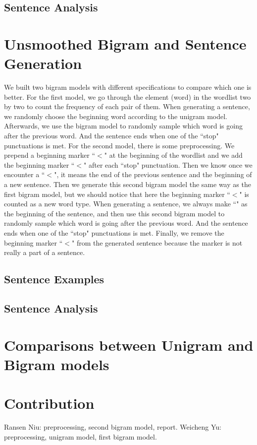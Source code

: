 \documentclass[a4paper, 11pt]{article}
\begin{document}
\subsection*{Sentence Analysis}

\section*{Unsmoothed Bigram and Sentence Generation}
We built two bigram models with different specifications to compare which one is better. \newline
\newline
For the first model, we go through the element (word) in the wordlist two by two to count the frequency of each pair of them. When generating a sentence, we randomly choose the beginning word according to the unigram model. Afterwards, we use the bigram model to randomly sample which word is going after the previous word. And the sentence ends when one of the ``stop" punctuations is met.\newline
\newline
For the second model, there is some preprocessing. We prepend a beginning marker ``$<$" at the beginning of the wordlist and we add the beginning marker ``$<$" after each ``stop" punctuation. Then we know once we encounter a ``$<$", it means the end of the previous sentence and the beginning of a new sentence. Then we generate this second bigram model the same way as the first bigram model, but we should notice that here the beginning marker ``$<$" is counted as a new word type. When generating a sentence, we always make ``" as the beginning of the sentence, and then use this second bigram model to randomly sample which word is going after the previous word. And the sentence ends when one of the ``stop" punctuations is met. Finally, we remove the beginning marker ``$<$" from the generated sentence because the marker is not really a part of a sentence.\newline

\subsection*{Sentence Examples}
\subsection*{Sentence Analysis}

\section*{Comparisons between Unigram and Bigram models}

\section*{Contribution}
Ransen Niu: preprocessing, second bigram model, report.\newline
\newline
Weicheng Yu: preprocessing, unigram model, first bigram model.
\end{document}
